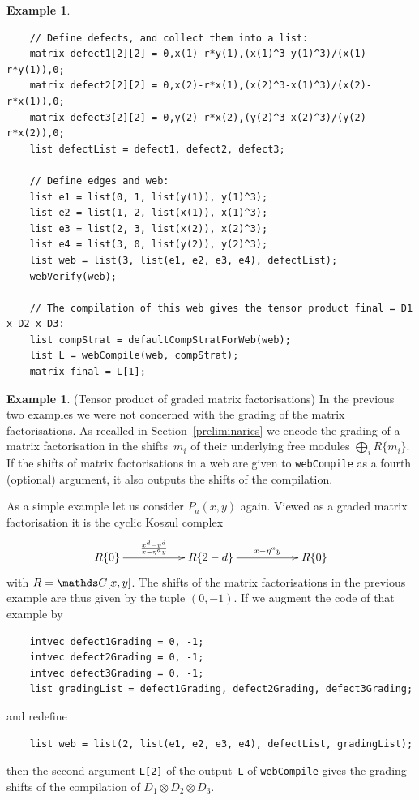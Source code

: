 \documentclass{compositio}
\theoremstyle{definition}
\newtheorem{example}[theorem]{Example}
\numberwithin{equation}{section}
\begin{document}
\begin{example}
{\begin{verbatim}
    // Define defects, and collect them into a list:
    matrix defect1[2][2] = 0,x(1)-r*y(1),(x(1)^3-y(1)^3)/(x(1)-r*y(1)),0;
    matrix defect2[2][2] = 0,x(2)-r*x(1),(x(2)^3-x(1)^3)/(x(2)-r*x(1)),0;
    matrix defect3[2][2] = 0,y(2)-r*x(2),(y(2)^3-x(2)^3)/(y(2)-r*x(2)),0;
    list defectList = defect1, defect2, defect3;
    
    // Define edges and web:
    list e1 = list(0, 1, list(y(1)), y(1)^3);
    list e2 = list(1, 2, list(x(1)), x(1)^3);
    list e3 = list(2, 3, list(x(2)), x(2)^3);
    list e4 = list(3, 0, list(y(2)), y(2)^3);
    list web = list(3, list(e1, e2, e3, e4), defectList);
    webVerify(web);
    
    // The compilation of this web gives the tensor product final = D1 x D2 x D3:
    list compStrat = defaultCompStratForWeb(web);
    list L = webCompile(web, compStrat);
    matrix final = L[1];
\end{verbatim}
}
\end{example}


\begin{example}(Tensor product of graded matrix factorisations) 
In the previous two examples we were not concerned with the grading of the matrix factorisations. As recalled in Section~\ref{preliminaries} we encode the grading of a matrix factorisation in the shifts~$m_{i}$ of their underlying free modules $\bigoplus_{i}R\{m_{i}\}$. If the shifts of matrix factorisations in a web are given to \texttt{webCompile} as a fourth (optional) argument, it also outputs the shifts of the compilation. 

As a simple example let us consider $P_{a}(x,y)$ again. Viewed as a graded matrix factorisation it is the cyclic Koszul complex
$$
\xymatrix{%
R\{0\} \ar[rr]^-{\frac{x^d-y^d}{x-\eta^{a}y}} && R\{2-d\}  \ar[rr]^-{x-\eta^{a}y} && R\{0\}
}
$$
with $R=\nC[x,y]$. The shifts of the matrix factorisations in the previous example are thus given by the tuple $(0,-1)$. If we augment the code of that example by
{\footnotesize
\begin{verbatim}
    intvec defect1Grading = 0, -1;
    intvec defect2Grading = 0, -1;
    intvec defect3Grading = 0, -1;
    list gradingList = defect1Grading, defect2Grading, defect3Grading;
\end{verbatim}
}
\noindent and redefine
{\footnotesize
\begin{verbatim}
    list web = list(2, list(e1, e2, e3, e4), defectList, gradingList);
\end{verbatim}
}
\noindent then the second argument \texttt{L[2]} of the output~\texttt{L} of \texttt{webCompile} gives the grading shifts of the compilation of $D_{1}\otimes D_{2}\otimes D_{3}$. 
\end{example}
\end{document}

